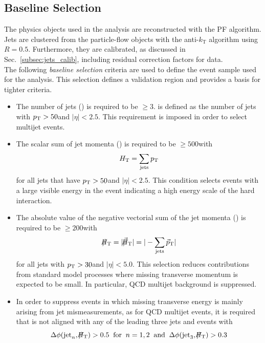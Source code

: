 \subsection{Baseline Selection}
\label{subsec:RA2_baseline}
The physics objects used in the analysis are reconstructed with the PF algorithm. Jets are clustered from the particle-flow objects with the anti-$k_\mathrm{T}$ algorithm using $R = 0.5$. Furthermore, they are calibrated, as discussed in Sec.~\ref{subsec:jets_calib}, including residual correction factors for data. \\
The following \textit{baseline selection} criteria are used to define the event sample used for the analysis. This selection defines a validation region and provides a basis for tighter criteria.
\begin{itemize}
 \item{The number of jets (\NJets) is required to be $\ge 3$. \NJets is defined as the number of jets with $p_{\text{T}} > 50$\gev and $|\eta| < 2.5$. This requirement is imposed in order to select multijet events.}
 \item{The scalar sum of jet momenta (\HT) is required to be $\ge 500$\gev with 
\begin{equation*}
H_{\text{T}} = \sum_{\mathrm{jets}} p_{\text{T}} 
\end{equation*}
for all jets that have $p_{\text{T}} > 50$\gev and $|\eta| < 2.5$. This condition selects events with a large visible energy in the event indicating a high energy scale of the hard interaction.}   
 \item{The absolute value of the negative vectorial sum of the jet momenta (\MHT) is required to be $\ge 200$\gev with
\begin{equation*}
\slash\mkern-12mu{H}_{\text{T}} = |\slash\mkern-12mu{\vec{H}}_{\text{T}}|= |- \sum_{\mathrm{jets}} \vec{p}_{\text{T}} |
\end{equation*}
for all jets with $p_{\text{T}} > 30$\gev and $|\eta| < 5.0$. This selection reduces contributions from standard model processes where missing transverse momentum is expected to be small. In particular, QCD multijet background is suppressed. } 
 \item{In order to suppress events in which missing transverse energy is mainly arising from jet mismeasurements, as for QCD multijet events, it is required that \MHT is not aligned with any of the leading three jets and events with
\begin{equation*}
\Delta \phi(\mathrm{jet}_n, \slash\mkern-12mu{H}_{\text{T}}) > 0.5 \;\; \mathrm{for} \;\; n = 1,2 \;\; \mathrm{and} \;\; \Delta \phi(\mathrm{jet}_3, \slash\mkern-12mu{H}_{\text{T}}) > 0.3
\end{equation*} 
}
\end{itemize}
